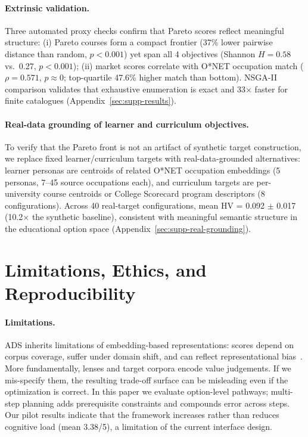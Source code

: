 \documentclass[sigconf,review]{acmart}
\newcommand{\ADS}{\textsc{ADS}\xspace}
\begin{document}
\paragraph{Extrinsic validation.}
Three automated proxy checks confirm that Pareto scores reflect meaningful structure: (i) Pareto courses form a compact frontier (37\% lower pairwise distance than random, $p < 0.001$) yet span all 4 objectives (Shannon $H = 0.58$ vs.\ 0.27, $p < 0.001$); (ii) market scores correlate with O*NET occupation match ($\rho = 0.571$, $p \approx 0$; top-quartile 47.6\% higher match than bottom). NSGA-II~\cite{deb2002nsga2} comparison validates that exhaustive enumeration is exact and 33$\times$ faster for finite catalogues (Appendix~\ref{sec:supp-results}).

\paragraph{Real-data grounding of learner and curriculum objectives.}
To verify that the Pareto front is not an artifact of synthetic target construction, we replace fixed learner/curriculum targets with real-data-grounded alternatives: learner personas are centroids of related O*NET occupation embeddings (5 personas, 7--45 source occupations each), and curriculum targets are per-university course centroids or College Scorecard program descriptors (8 configurations). Across 40 real-target configurations, mean HV = 0.092 $\pm$ 0.017 (10.2$\times$ the synthetic baseline), consistent with meaningful semantic structure in the educational option space (Appendix~\ref{sec:supp-real-grounding}).


\section{Limitations, Ethics, and Reproducibility}
\label{sec:ethics}

\paragraph{Limitations.}
\ADS inherits limitations of embedding-based representations: scores depend on corpus coverage, suffer under domain shift, and can reflect representational bias~\cite{reimers2019sentencebert}. More fundamentally, lenses and target corpora encode value judgements. If we mis-specify them, the resulting trade-off surface can be misleading even if the optimization is correct. In this paper we evaluate option-level pathways; multi-step planning adds prerequisite constraints and compounds error across steps. Our pilot results indicate that the framework increases rather than reduces cognitive load (mean 3.38/5), a limitation of the current interface design.
\end{document}

